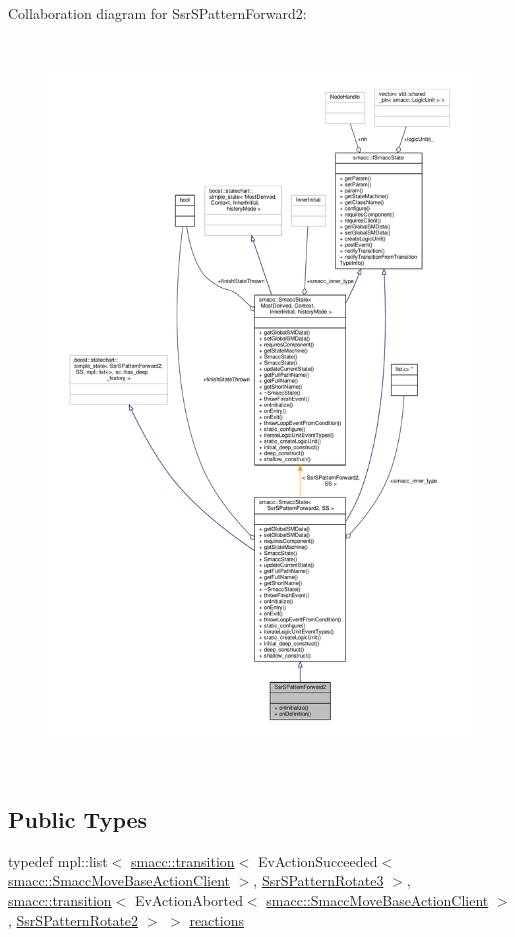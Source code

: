 Collaboration diagram for Ssr\+S\+Pattern\+Forward2\+:
\nopagebreak
\begin{figure}[H]
\begin{center}
\leavevmode
\includegraphics[height=550pt]{structSsrSPatternForward2__coll__graph}
\end{center}
\end{figure}
\subsection*{Public Types}
\begin{DoxyCompactItemize}
\item 
typedef mpl\+::list$<$ \hyperlink{classsmacc_1_1transition}{smacc\+::transition}$<$ Ev\+Action\+Succeeded$<$ \hyperlink{classsmacc_1_1SmaccMoveBaseActionClient}{smacc\+::\+Smacc\+Move\+Base\+Action\+Client} $>$, \hyperlink{structSsrSPatternRotate3}{Ssr\+S\+Pattern\+Rotate3} $>$, \hyperlink{classsmacc_1_1transition}{smacc\+::transition}$<$ Ev\+Action\+Aborted$<$ \hyperlink{classsmacc_1_1SmaccMoveBaseActionClient}{smacc\+::\+Smacc\+Move\+Base\+Action\+Client} $>$, \hyperlink{structSsrSPatternRotate2}{Ssr\+S\+Pattern\+Rotate2} $>$ $>$ \hyperlink{structSsrSPatternForward2_af4045e4c93ca510b7348dc6a9d5fc84d}{reactions}
\end{DoxyCompactItemize}
